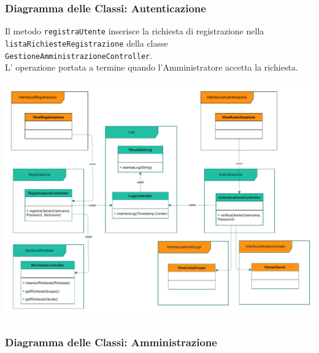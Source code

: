 \subsubsection*{Diagramma delle Classi: Autenticazione}
\vspace{1cm}
Il metodo \verb|registraUtente| inserisce la richiesta di registrazione nella \\\verb|listaRichiesteRegistrazione| della classe \verb|GestioneAmministrazioneController|.\\
L' operazione portata a termine quando l'Amministratore accetta la richiesta.
\vspace{2cm}
\begin{adjustwidth}{-2.5cm}{0cm}
\includegraphics[scale=0.7]{classi/Package-Classi-Autenticazione.drawio.pdf}
\end{adjustwidth}



\subsubsection*{Diagramma delle Classi: Amministrazione}
\vspace{0.5cm}

